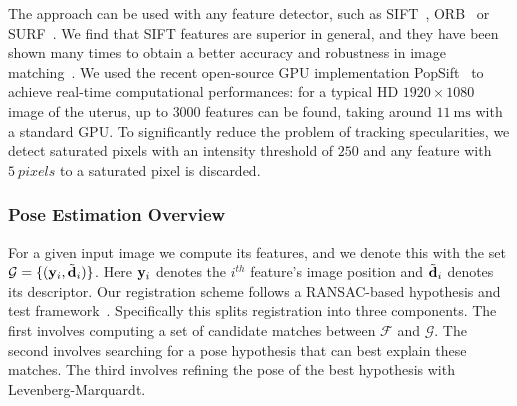 The approach can be used with any feature detector, such as SIFT~\cite{Lowe:2004:DIF:993451.996342}, ORB~\cite{orbslam_laparo} or SURF~\cite{SURF}. We find that SIFT features are superior in general, and they have been shown many times to obtain a better accuracy and robustness in image matching~\cite{Tuytelaars2007}. We used the recent open-source GPU implementation PopSift~\cite{Griwodz2018Popsift} to achieve real-time computational performances: for a typical HD $1920\times1080$ image of the uterus, up to $3000$ features can be found, taking around $\SI{11}{\milli\second}$ with a standard GPU.
To significantly reduce the problem of tracking specularities, we detect saturated pixels with an intensity threshold of $250$ and any feature with $\SI{5}{pixels}$ to a saturated pixel is discarded.  

\subsubsection{Pose Estimation Overview}
\label{sec:registration}
For a given input image we compute its features, and %
we denote this with the set $\mathcal{G}=\{(\mathbf{y}_{i},\tilde{\mathbf{d}}_{i})\}$. Here $\mathbf{y}_{i}$ denotes the $i^{th}$ feature's image position and $\tilde{\mathbf{d}}_{i}$ denotes its descriptor. Our registration scheme follows a RANSAC-based hypothesis and test framework~\cite{Fischler:1981:RSC:358669.358692}. Specifically this splits registration into three components. The first involves computing a set of candidate matches between $\mathcal{F}$ and $\mathcal{G}$. The second involves searching for a pose hypothesis that can best explain these matches. The third involves refining the pose of the best hypothesis with Levenberg-Marquardt.

